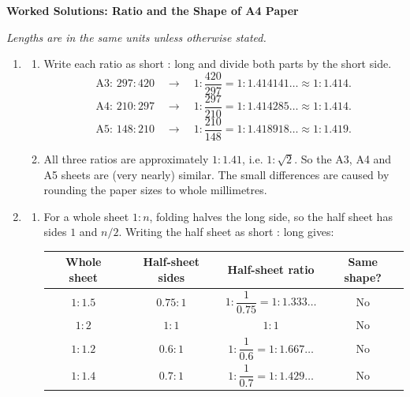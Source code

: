 \documentclass[11pt,a4paper]{article}
\begin{document}
\begin{center}
{\Large\bfseries Worked Solutions: Ratio and the Shape of A4 Paper}
\end{center}
\vspace{-4pt}
\noindent\textit{Lengths are in the same units unless otherwise stated.}

\begin{enumerate}[label=\textbf{Q\arabic*.}, leftmargin=*, itemsep=1.2em]

\item
\begin{enumerate}[label=(\alph*)]
\item Write each ratio as short : long and divide both parts by the short side.
\[
\text{A3: }297:420
  \quad\longrightarrow\quad
  1:\frac{420}{297}
  =1:1.414141\ldots\approx 1:1.414.
\]
\[
\text{A4: }210:297
  \quad\longrightarrow\quad
  1:\frac{297}{210}
  =1:1.414285\ldots\approx 1:1.414.
\]
\[
\text{A5: }148:210
  \quad\longrightarrow\quad
  1:\frac{210}{148}
  =1:1.418918\ldots\approx 1:1.419.
\]

\item All three ratios are approximately \(1:1.41\), i.e. \(1:\sqrt2\). So the A3, A4 and A5 sheets are (very nearly) similar. The small differences are caused by rounding the paper sizes to whole millimetres.
\end{enumerate}

\item
\begin{enumerate}[label=(\alph*)]
\item For a whole sheet \(1:n\), folding halves the long side, so the half sheet has sides \(1\) and \(n/2\). Writing the half sheet as short : long gives:
\begin{center}
\begin{tabular}{|c|c|c|c|}
\hline
Whole sheet & Half-sheet sides & Half-sheet ratio & Same shape?\\
\hline
\(1:1.5\) & \(0.75:1\) & \(1:\dfrac{1}{0.75}=1:1.333\ldots\) & No\\
\hline
\(1:2\) & \(1:1\) & \(1:1\) & No\\
\hline
\(1:1.2\) & \(0.6:1\) & \(1:\dfrac{1}{0.6}=1:1.667\ldots\) & No\\
\hline
\(1:1.4\) & \(0.7:1\) & \(1:\dfrac{1}{0.7}=1:1.429\ldots\) & No\\
\hline
\end{tabular}
\end{center}


\end{enumerate}
\end{enumerate}
\end{document}
